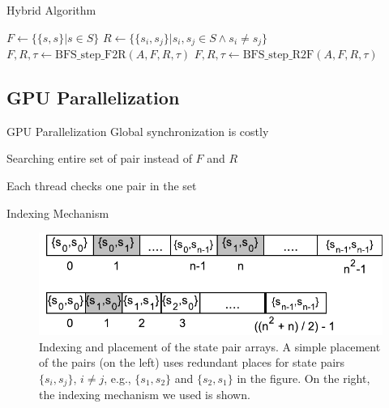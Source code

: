 \documentclass{beamer}
\begin{document}
\begin{frame}{Hybrid Algorithm}
\begin{algorithm}[H]
	\label{algo:BFS-Hybrid}
	\caption{Computing a function $\tau : S^{\langle 2 \rangle} \rightarrow \Sigma^\star$ (Hybrid)}
	
	

	
	$F \longleftarrow \{ \{ s,s \} | s \in S \}$\;
	$R \longleftarrow \{ \{ s_i,s_j \} | s_i,s_j \in S \wedge s_i \neq s_j \}$\;
	{
		{
			$F,R,\tau \longleftarrow \mbox{BFS\_step\_F2R}(A,F,R,\tau)$\;
		}
		\Else
		{
			$F,R,\tau \longleftarrow \mbox{BFS\_step\_R2F}(A,F,R,\tau)$\;
		}
	}
\end{algorithm}
\end{frame}

\subsection{GPU Parallelization}
\begin{frame}{GPU Parallelization}
	Global synchronization is costly
	
	\medskip
	
	Searching entire set of pair instead of $F$ and $R$
	
	\medskip
	
	Each thread checks one pair in the set
\end{frame}

\begin{frame}{Indexing Mechanism}
	\begin{figure}
	\centering
	\includegraphics[width=\textwidth]{figs/memory.pdf}
	\caption{Indexing and placement of the state pair arrays. A simple placement of the pairs (on the left) uses redundant places for state pairs $\{s_i, s_j\}$, $i \neq j$, e.g., $\{s_1, s_2\}$ and $\{s_2, s_1\}$ in the figure. On the right, the indexing mechanism we used is shown.}
	\label{fig:mem}
\end{figure}
\end{frame}
\end{document}
